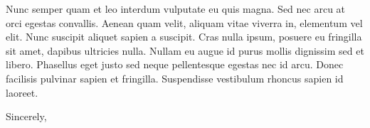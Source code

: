 \documentclass[11pt,a4paper]{letter} %
\begin{document}
\begin{letter}
Nunc semper quam et leo interdum vulputate eu quis magna. Sed nec arcu
at orci egestas convallis. Aenean quam velit, aliquam vitae viverra
in, elementum vel elit. Nunc suscipit aliquet sapien a suscipit. Cras
nulla ipsum, posuere eu fringilla sit amet, dapibus ultricies
nulla. Nullam eu augue id purus mollis dignissim sed et
libero. Phasellus eget justo sed neque pellentesque egestas nec id
arcu. Donec facilisis pulvinar sapien et fringilla. Suspendisse
vestibulum rhoncus sapien id laoreet.

\closing{Sincerely,}


\end{letter}
\end{document}
